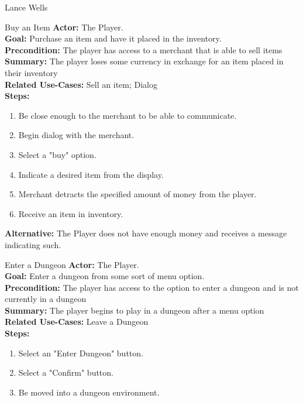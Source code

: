 \documentclass[12pt]{report}
\begin{document}
\begin{section}{Lance Wells}

\begin{subsection}{Buy an Item}
\textbf{Actor:} The Player. \\
\textbf{Goal:} Purchase an item and have it placed in the inventory. \\
\textbf{Precondition:} The player has access to a merchant that is able to sell items \\
\textbf{Summary:} The player loses some currency in exchange for an item placed in their inventory \\
\textbf{Related Use-Cases:} Sell an item; Dialog \\
\textbf{Steps:}
\begin{enumerate}
	\item Be close enough to the merchant to be able to communicate.
	\item Begin dialog with the merchant.
	\item Select a "buy" option.
	\item Indicate a desired item from the display.
	\item Merchant detracts the specified amount of money from the player.
	\item Receive an item in inventory.
\end{enumerate}
\textbf{Alternative:} The Player does not have enough money and receives a message indicating such.
\end{subsection}

\begin{subsection}{Enter a Dungeon}
\textbf{Actor:} The Player. \\
\textbf{Goal:} Enter a dungeon from some sort of menu option. \\
\textbf{Precondition:} The player has access to the option to enter a dungeon and is not currently in a dungeon \\
\textbf{Summary:} The player begins to play in a dungeon after a menu option \\
\textbf{Related Use-Cases:} Leave a Dungeon \\
\textbf{Steps:}
\begin{enumerate}
	\item Select an "Enter Dungeon" button.
	\item Select a "Confirm" button.
	\item Be moved into a dungeon environment.
\end{enumerate}
\end{subsection}


\end{section}
\end{document}
